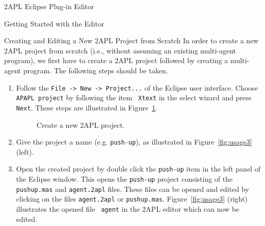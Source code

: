 \begin{chapter}{2APL Eclipse Plug-in Editor}
\begin{section}{Getting Started with the Editor}
\begin{subsection}{Creating and Editing a New 2APL Project from Scratch}
In order to create a new 2APL project from scratch (i.e., without
assuming an existing multi-agent program), we first have to create a
2APL project followed by creating a multi-agent program. The
following steps should be taken.
\begin{enumerate}
        \item Follow the {\tt File -> New -> Project...} of the Eclipse user
        interface. Choose {\tt APAPL project} by following the item {\tt
        Xtext} in the select wizard and press {\tt Next}. These
        steps are illustrated in Figure~\ref{fig:usage1}.
        \begin{figure}[h]
            \begin{minipage}{0.6\linewidth}
                \begin{center}
                \end{center}
            \end{minipage}
            \hspace{.5cm}
            \begin{minipage}{0.3\linewidth}
                \begin{center}
                \end{center}
            \end{minipage}
            \caption{Create a new 2APL project.}\label{fig:usage1}
        \end{figure}

        \item Give the project a name (e.g. \texttt{push-up}), as
        illustrated in Figure~\ref{fig:usage3}(left).

        \item Open the created project by double click the {\tt push-up} item in the left panel of the Eclipse window.
        This opens the {\tt push-up} project consisting of the \texttt{pushup.mas} and {\tt agent.2apl}
        files. These files can be opened and edited by clicking on
        the files {\tt agent.2apl} or {\tt pushup.mas}.
        Figure~\ref{fig:usage3} (right) illustrates the opened file {\tt
        agent} in the 2APL editor which can now be edited.


\end{enumerate}
\end{subsection}
\end{section}
\end{chapter}
